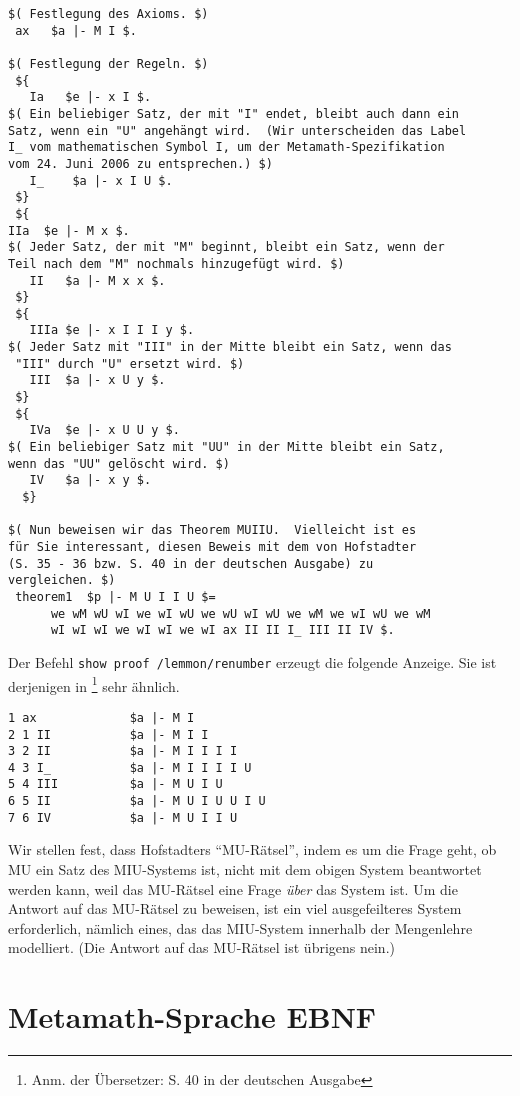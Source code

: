 \begin{verbatim}
$( Festlegung des Axioms. $)
 ax   $a |- M I $.

$( Festlegung der Regeln. $)
 ${
   Ia   $e |- x I $.
$( Ein beliebiger Satz, der mit "I" endet, bleibt auch dann ein
Satz, wenn ein "U" angehängt wird.  (Wir unterscheiden das Label
I_ vom mathematischen Symbol I, um der Metamath-Spezifikation
vom 24. Juni 2006 zu entsprechen.) $)
   I_    $a |- x I U $.
 $}
 ${
IIa  $e |- M x $.
$( Jeder Satz, der mit "M" beginnt, bleibt ein Satz, wenn der
Teil nach dem "M" nochmals hinzugefügt wird. $)
   II   $a |- M x x $.
 $}
 ${
   IIIa $e |- x I I I y $.
$( Jeder Satz mit "III" in der Mitte bleibt ein Satz, wenn das
 "III" durch "U" ersetzt wird. $)
   III  $a |- x U y $.
 $}
 ${
   IVa  $e |- x U U y $.
$( Ein beliebiger Satz mit "UU" in der Mitte bleibt ein Satz,
wenn das "UU" gelöscht wird. $)
   IV   $a |- x y $.
  $}

$( Nun beweisen wir das Theorem MUIIU.  Vielleicht ist es
für Sie interessant, diesen Beweis mit dem von Hofstadter
(S. 35 - 36 bzw. S. 40 in der deutschen Ausgabe) zu
vergleichen. $)
 theorem1  $p |- M U I I U $=
      we wM wU wI we wI wU we wU wI wU we wM we wI wU we wM
      wI wI wI we wI wI we wI ax II II I_ III II IV $.
\end{verbatim}

Der Befehl \texttt{show proof /lemmon/renumber} erzeugt die folgende Anzeige.  Sie ist derjenigen in \cite[S.~35--36]{Hofstadter}\footnote{Anm. der Übersetzer: S. 40 in der deutschen Ausgabe} sehr ähnlich.

\begin{verbatim}
1 ax             $a |- M I
2 1 II           $a |- M I I
3 2 II           $a |- M I I I I
4 3 I_           $a |- M I I I I U
5 4 III          $a |- M U I U
6 5 II           $a |- M U I U U I U
7 6 IV           $a |- M U I I U
\end{verbatim}

Wir stellen fest, dass Hofstadters "`MU-Rätsel"', indem es um die Frage geht, ob MU ein Satz des MIU-Systems ist, nicht mit dem obigen System beantwortet werden kann, weil das MU-Rätsel eine Frage {\em über} das System ist.  Um die Antwort auf das MU-Rätsel zu beweisen, ist ein viel ausgefeilteres System erforderlich, nämlich eines, das das MIU-System innerhalb der Mengenlehre modelliert.  (Die Antwort auf das MU-Rätsel ist übrigens nein.)


\chapter{Metamath-Sprache EBNF}%
\label{BNF}%

